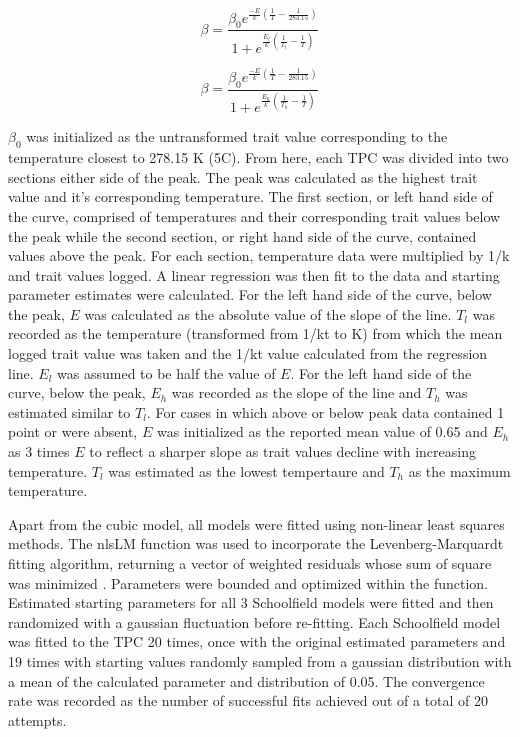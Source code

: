 \documentclass[11pt]{article}
\begin{document}
\begin{linenumbers}
\begin{equation}
\beta = \frac{\beta_0 e^{\frac{-E}{k} (\frac{1}{T} - \frac{1}{283.15})}}
{ 1  + e^{\frac{E_l}{k} (\frac{1}{T_l} - \frac{1}{T})}}\tag{4}
\end{equation}

\begin{equation}
\beta = \frac{\beta_0 e^{\frac{-E}{k} (\frac{1}{T} - \frac{1}{283.15})}}
{ 1  + e^{\frac{E_h}{k} (\frac{1}{T_h} - \frac{1}{T})}}\tag{5}
\end{equation}

\vspace{0.1cm}
\(\beta_0\) was initialized as the untransformed trait value corresponding to the temperature closest to 278.15 K (5\degree C). From here, each TPC was divided into two sections either side of the peak. The peak was calculated as the highest trait value and it's corresponding temperature. The first section, or left hand side of the curve, comprised of temperatures and their corresponding trait values below the peak while the second section, or right hand side of the curve, contained values above the peak. For each section, temperature data were multiplied by 1/k and trait values logged. A linear regression was then fit to the data and starting parameter estimates were calculated. For the left hand side of the curve, below the peak, \(E\) was calculated as the absolute value of the slope of the line. \(T_l\) was recorded as the temperature (transformed from 1/kt to K) from which the mean logged trait value was taken and the 1/kt value calculated from the regression line. \(E_l\) was assumed to be half the value of \(E\). For the left hand side of the curve, below the peak, \(E_h \) was recorded as the slope of the line and \(T_h\) was estimated similar to \(T_l\). For cases in which above or below peak data contained 1 point or were absent, \(E\) was initialized as the reported mean value of 0.65 \cite{pub.1026914980} and \(E_h \) as 3 times \(E\) to reflect a sharper slope as trait values decline with increasing temperature. \(T_l\) was estimated as the lowest tempertaure and \(T_h\) as the maximum temperature.

Apart from the cubic model, all models were fitted using non-linear least squares methods. The nlsLM function was used to incorporate the Levenberg-Marquardt fitting algorithm, returning a vector of weighted residuals whose sum of square was minimized \cite{minpack}. Parameters were bounded and optimized within the function. Estimated starting parameters for all 3 Schoolfield models were fitted and then randomized with a gaussian fluctuation before re-fitting. Each Schoolfield model was fitted to the TPC 20 times, once with the original estimated parameters and 19 times with starting values randomly sampled from a gaussian distribution with a mean of the calculated parameter and distribution of 0.05. The convergence rate was recorded as the number of successful fits achieved out of a total of 20 attempts. 


\end{linenumbers}
\end{document}
